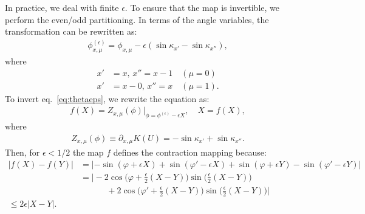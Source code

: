 \documentclass[12pt]{article}
\begin{document}
In practice, we deal with finite $\epsilon$.
To ensure that the map is invertible,
we perform the even/odd partitioning.
In terms of the angle variables,
the transformation can be rewritten as:
\begin{align}
  \phi_{x,\mu}^{(\epsilon)} =
  \phi_{x,\mu}
  -
  \epsilon (\sin \kappa_{x'} - \sin \kappa_{x''}), \label{eq:thetaeps}
\end{align}
where
\begin{align}
  x' &= x,  \, x'' = x-1 \quad (\mu=0) \\
  x' &= x-0, \, x'' = x \quad (\mu=1).
\end{align}
To invert eq.~\eqref{eq:thetaeps},
we rewrite the equation as:
\begin{align}
  f(X) = Z_{x,\mu}(\phi)
  |_{\phi = \phi^{(\epsilon)}-\epsilon X}, \quad
  X=f(X),
\end{align}
where
\begin{align}
  Z_{x,\mu}(\phi) \equiv
  \partial_{x,\mu} K(U)
  = -\sin \kappa_{x'} + \sin \kappa_{x''}.
\end{align}
Then, for $\epsilon<1/2$ the map $f$ defines
the contraction mapping because:
\begin{align}
  |f(X)-f(Y)|
  &=
    |-\sin(\varphi+\epsilon X)+\sin(\varphi'-\epsilon X)
    +\sin(\varphi+\epsilon Y)-\sin(\varphi'-\epsilon Y)| \nonumber\\
  &=
    \Big|-2 \cos\Big(\varphi + \frac{\epsilon}{2}(X-Y)\Big) \sin\Big(\frac{\epsilon}{2}(X-Y)\Big) \\
  &~~~~~~~~~~~~~~
    + 2 \cos\Big(\varphi' + \frac{\epsilon}{2}(X-Y)\Big) \sin\Big(\frac{\epsilon}{2}(X-Y)\Big)\Big| \nonumber\\
  \leq 2 \epsilon |X-Y|.
\end{align}
\end{document}
